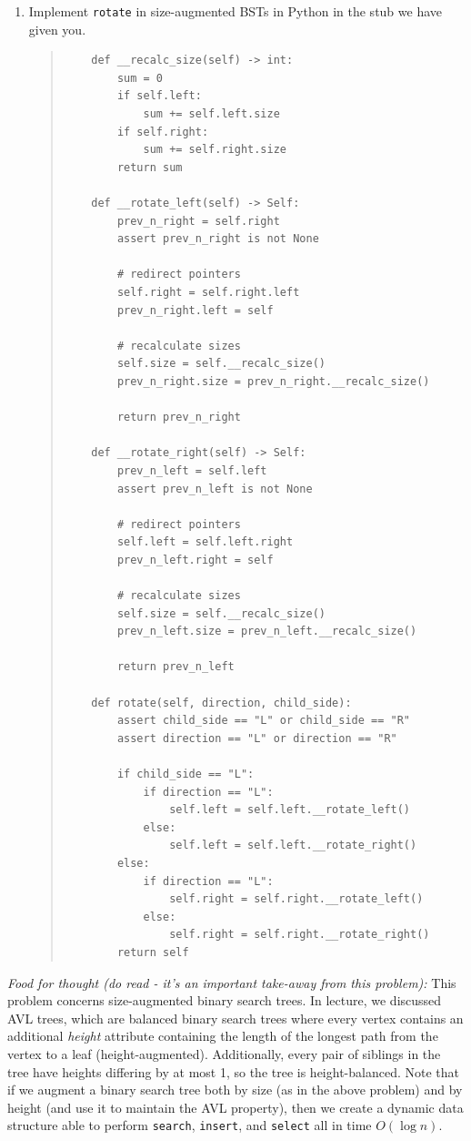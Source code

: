 \documentclass[11pt]{article}
\begin{document}
\begin{enumerate}
\begin{enumerate}
        \newpage
        \item Implement \texttt{rotate} in size-augmented BSTs in Python in the stub we have given you.
        \begin{quote}
            \color{purple}
           \begin{verbatim} 
    def __recalc_size(self) -> int:
        sum = 0
        if self.left:
            sum += self.left.size
        if self.right:
            sum += self.right.size
        return sum

    def __rotate_left(self) -> Self:
        prev_n_right = self.right
        assert prev_n_right is not None

        # redirect pointers
        self.right = self.right.left
        prev_n_right.left = self

        # recalculate sizes
        self.size = self.__recalc_size()
        prev_n_right.size = prev_n_right.__recalc_size()

        return prev_n_right

    def __rotate_right(self) -> Self:
        prev_n_left = self.left
        assert prev_n_left is not None

        # redirect pointers
        self.left = self.left.right
        prev_n_left.right = self

        # recalculate sizes
        self.size = self.__recalc_size()
        prev_n_left.size = prev_n_left.__recalc_size()

        return prev_n_left

    def rotate(self, direction, child_side):
        assert child_side == "L" or child_side == "R"
        assert direction == "L" or direction == "R"

        if child_side == "L":
            if direction == "L":
                self.left = self.left.__rotate_left()
            else:
                self.left = self.left.__rotate_right()
        else:
            if direction == "L":
                self.right = self.right.__rotate_left()
            else:
                self.right = self.right.__rotate_right()
        return self
           \end{verbatim}
        \end{quote}
        \vspace{1em}
    
    \end{enumerate}
    
    \emph{Food for thought (do read - it's an important take-away from this problem):} This problem concerns size-augmented binary search trees. In lecture, we discussed AVL trees, which are balanced binary search trees where every vertex contains an additional \textit{height} attribute containing the length of the longest path from the vertex to a leaf (height-augmented). Additionally, every pair of siblings in the tree have heights differing by at most 1, so the tree is height-balanced. Note that if we augment a binary search tree both by size (as in the above problem) and by height (and use it to maintain the AVL property), then we create a dynamic data structure able to perform \texttt{search}, \texttt{insert}, and \texttt{select} all in time $O(\log n)$. 


\end{enumerate}
\end{document}
